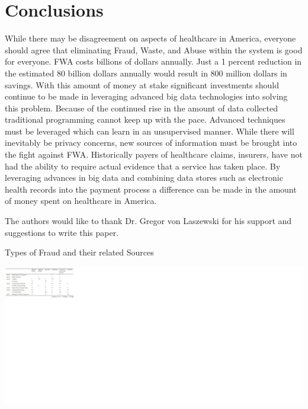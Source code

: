 \documentclass[sigconf]{acmart}
\begin{document}
\section{Conclusions}

While there may be disagreement on aspects of healthcare in America, everyone should agree that eliminating Fraud, Waste, and Abuse within the system is good for everyone.  FWA costs billions of dollars annually.  Just a 1 percent reduction in the estimated 80 billion dollars annually would result in 800 million dollars in savings.  With this amount of money at stake significant investments should continue to be made in leveraging advanced big data technologies into solving this problem.  Because of the continued rise in the amount of data collected traditional programming cannot keep up with the pace.  Advanced techniques must be leveraged which can learn in an unsupervised manner.  
While there will inevitably be privacy concerns, new sources of information must be brought into the fight against FWA.  Historically payers of healthcare claims, insurers, have not had the ability to require actual evidence that a service has taken place.  By leveraging advances in big data and combining data stores such as electronic health records into the payment process a difference can be made in the amount of money spent on healthcare in America.  

\begin{acks}

  The authors would like to thank Dr. Gregor von Laszewski for his
  support and suggestions to write this paper.

\end{acks}


 

\begin{table}[htb]
    \caption{Types of Fraud and their related Sources}
    \label{fig:TypesofFraud}
    \includegraphics{images/TypesofFraud.jpg}
\end{table}
\end{document}
